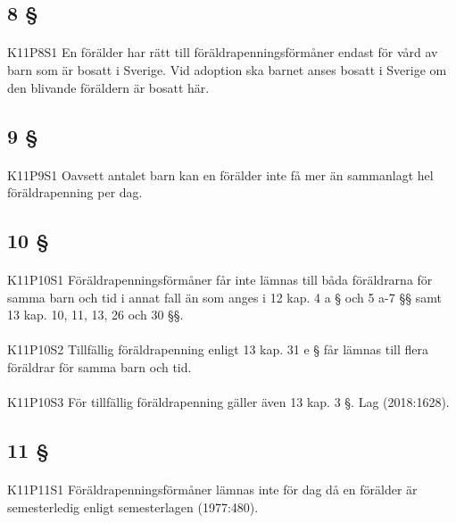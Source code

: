 \documentclass[a4paper,notitlepage,openany,10pt]{book}
\begin{document}
\subsection*{8 §}
\paragraph*{}
{\tiny K11P8S1}
En förälder har rätt till föräldrapenningsförmåner endast för vård av barn som är bosatt i Sverige. Vid adoption ska barnet anses bosatt i Sverige om den blivande föräldern är bosatt här.
\subsection*{9 §}
\paragraph*{}
{\tiny K11P9S1}
Oavsett antalet barn kan en förälder inte få mer än sammanlagt hel föräldrapenning per dag.
\subsection*{10 §}
\paragraph*{}
{\tiny K11P10S1}
Föräldrapenningsförmåner får inte lämnas till båda föräldrarna för samma barn och tid i annat fall än som anges i 12 kap. 4 a § och 5 a-7 §§ samt 13 kap. 10, 11, 13, 26 och 30 §§.
\paragraph*{}
{\tiny K11P10S2}
Tillfällig föräldrapenning enligt 13 kap. 31 e § får lämnas till flera föräldrar för samma barn och tid.
\paragraph*{}
{\tiny K11P10S3}
För tillfällig föräldrapenning gäller även 13 kap. 3 §.
Lag (2018:1628).
\subsection*{11 §}
\paragraph*{}
{\tiny K11P11S1}
Föräldrapenningsförmåner lämnas inte för dag då en förälder är semesterledig enligt semesterlagen (1977:480).
\end{document}
